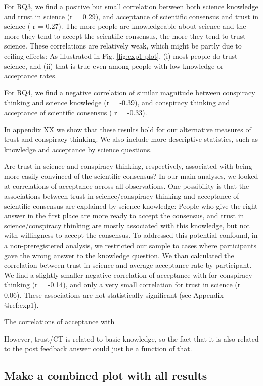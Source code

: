 \documentclass[
  doc,floatsintext]{apa6}
\begin{document}
For RQ3, we find a positive but small correlation between both science knowledge and trust in science (r = 0.29), and acceptance of scientific consensus and trust in science ( r = 0.27). The more people are knowledgeable about science and the more they tend to accept the scientific consensus, the more they tend to trust science. These correlations are relatively weak, which might be partly due to ceiling effects: As illustrated in Fig. \ref{fig:exp1-plot}, (i) most people do trust science, and (ii) that is true even among people with low knowledge or acceptance rates.

For RQ4, we find a negative correlation of similar magnitude between conspiracy thinking and science knowledge (r = -0.39), and conspiracy thinking and acceptance of scientific consensus ( r = -0.33).

In appendix XX we show that these results hold for our alternative measures of trust and conspiracy thinking. We also include more descriptive statistics, such as knowledge and acceptance by science questions.

Are trust in science and conspiracy thinking, respectively, associated with being more easily convinced of the scientific consensus? In our main analyses, we looked at correlations of acceptance across all observations. One possibility is that the associations between trust in science/conspiracy thinking and acceptance of scientific consensus are explained by science knowledge: People who give the right answer in the first place are more ready to accept the consensus, and trust in science/conspiracy thinking are mostly associated with this knowledge, but not with willingness to accept the consensus. To addressed this potential confound, in a non-preregistered analysis, we restricted our sample to cases where participants gave the wrong answer to the knowledge question. We than calculated the correlation between trust in science and average acceptance rate by participant. We find a slightly smaller negative correlation of acceptance with for conspiracy thinking (r = -0.14), and only a very small correlation for trust in science (r = 0.06). These associations are not statistically significant (see Appendix @ref:exp1).

The correlations of acceptance with

However, trust/CT is related to basic knowledge, so the fact that it is also related to the post feedback answer could just be a function of that.

\hypertarget{make-a-combined-plot-with-all-results}{%
\subsection{Make a combined plot with all results}\label{make-a-combined-plot-with-all-results}}
\end{document}
